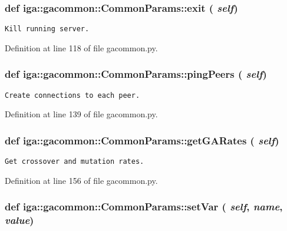 \subsubsection{\setlength{\rightskip}{0pt plus 5cm}def iga::gacommon::CommonParams::exit ( {\em self})}\label{classiga_1_1gacommon_1_1CommonParams_f813f7ddd0bfe0c749e01e03f9c715e2}




\footnotesize\begin{verbatim}
Kill running server.
\end{verbatim}
\normalsize
 

Definition at line 118 of file gacommon.py.
\subsubsection{\setlength{\rightskip}{0pt plus 5cm}def iga::gacommon::CommonParams::pingPeers ( {\em self})}\label{classiga_1_1gacommon_1_1CommonParams_474449103b92f011fb2a2a0fd4c1c2b3}




\footnotesize\begin{verbatim}
Create connections to each peer.
\end{verbatim}
\normalsize
 

Definition at line 139 of file gacommon.py.
\subsubsection{\setlength{\rightskip}{0pt plus 5cm}def iga::gacommon::CommonParams::getGARates ( {\em self})}\label{classiga_1_1gacommon_1_1CommonParams_a85870e30bbd939451947a62342e8bed}




\footnotesize\begin{verbatim}
Get crossover and mutation rates.
\end{verbatim}
\normalsize
 

Definition at line 156 of file gacommon.py.
\subsubsection{\setlength{\rightskip}{0pt plus 5cm}def iga::gacommon::CommonParams::setVar ( {\em self},  {\em name},  {\em value})}\label{classiga_1_1gacommon_1_1CommonParams_55dffa51b02ac8c199d527d9d2ba9c90}





